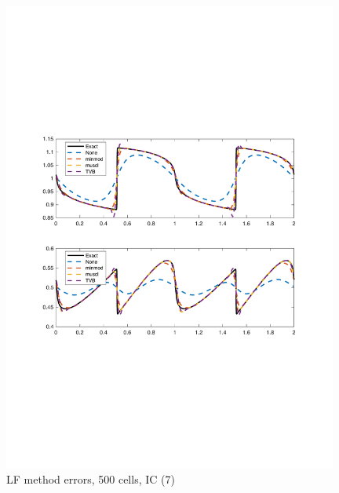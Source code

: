 \documentclass[11pt,a4paper]{article}
\begin{document}
\begin{figure}[!htb]
    \centering
    \includegraphics[width=11cm]{2_2_a_IC_3_LF.pdf}
    \caption{LF method errors, 500 cells, IC (7)}
    \label{fig:LF_IC_3}
\end{figure}
\end{document}
